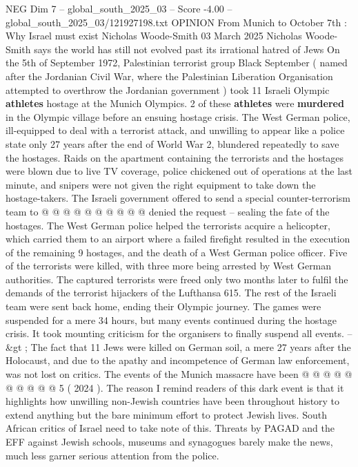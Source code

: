 \begin{textsample}{NEG Dim 7 – global\_south\_2025\_03 – Score -4.00 – global\_south\_2025\_03/121927198.txt}  \label{ex:f7_neg_357}
OPINION From Munich to October 7th : Why Israel must exist Nicholas Woode-Smith 03 March 2025 Nicholas Woode-Smith says the world has still not evolved past its irrational hatred of Jews On the 5th of September 1972, Palestinian terrorist group Black September ( named after the Jordanian Civil War, where the Palestinian Liberation Organisation attempted to overthrow the Jordanian government ) took 11 Israeli Olympic \textbf{athletes} hostage at the Munich Olympics. 2 of these \textbf{athletes} were \textbf{murdered} in the Olympic village before an ensuing hostage crisis.
The West German police, ill-equipped to deal with a terrorist attack, and unwilling to appear like a police state only 27 years after the end of World War 2, blundered repeatedly to save the hostages.
Raids on the apartment containing the terrorists and the hostages were blown due to live TV coverage, police chickened out of operations at the last minute, and snipers were not given the right equipment to take down the hostage-takers.
The Israeli government offered to send a special counter-terrorism team to @ @ @ @ @ @ @ @ @ @ denied the request -- sealing the fate of the hostages.
The West German police helped the terrorists acquire a helicopter, which carried them to an airport where a failed firefight resulted in the execution of the remaining 9 hostages, and the death of a West German police officer.
Five of the terrorists were killed, with three more being arrested by West German authorities.
The captured terrorists were freed only two months later to fulfil the demands of the terrorist hijackers of the Lufthansa 615.
The rest of the Israeli team were sent back home, ending their Olympic journey.
The games were suspended for a mere 34 hours, but many events continued during the hostage crisis.
It took mounting criticism for the organisers to finally suspend all events. -- \&gt ; The fact that 11 Jews were killed on German soil, a mere 27 years after the Holocaust, and due to the apathy and incompetence of German law enforcement, was not lost on critics.
The events of the Munich massacre have been @ @ @ @ @ @ @ @ @ @ 5 ( 2024 ).
The reason I remind readers of this dark event is that it highlights how unwilling non-Jewish countries have been throughout history to extend anything but the bare minimum effort to protect Jewish lives.
South African critics of Israel need to take note of this.
Threats by PAGAD and the EFF against Jewish schools, museums and synagogues barely make the news, much less garner serious attention from the police.

\end{textsample}
